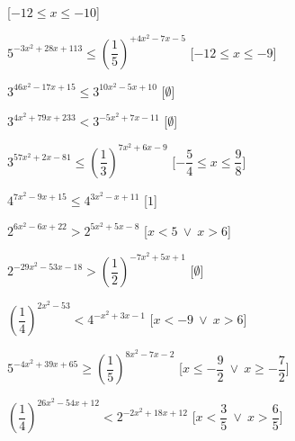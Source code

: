 \begin{esercizio}
\begin{enumeratea}
   \hfill [\(-12 \leqslant x \leqslant -10\)]
  \item  \(5^{-3 x^2 +28 x +113} \leqslant \left(\dfrac{1}{5}\right)^{+4 
x^2 -7 x -5}\)
   \hfill [\(-12 \leqslant x \leqslant -9\)]
  \item  \(3^{46 x^2 -17 x +15} \leqslant 3^{10 x^2 -5 x +10}\)
   \hfill [\(\emptyset\)]
  \item  \(3^{4 x^2 +79 x +233} < 3^{-5 x^2 +7 x -11}\)
   \hfill [\(\emptyset\)]
  \item  \(3^{57 x^2 +2 x -81} \leqslant \left(\dfrac{1}{3}\right)^{7 x^2 
+6 x -9}\)
   \hfill [\(-\dfrac{5}{4} \leqslant x \leqslant \dfrac{9}{8}\)]
  \item  \(4^{7 x^2 -9 x +15} \leqslant 4^{3 x^2 - x +11}\)
   \hfill [\(1\)]
  \item  \(2^{6 x^2 -6 x +22} > 2^{5 x^2 +5 x -8}\)
   \hfill [\(x < 5~\vee~x > 6\)]
  \item  \(2^{-29 x^2 -53 x -18} > 
\left(\dfrac{1}{2}\right)^{-7 x^2 +5 x +1}\)
   \hfill [\(\emptyset\)]
  \item  \(\left(\dfrac{1}{4}\right)^{2 x^2 -53} < 4^{-x^2 +3 x -1}\)
   \hfill [\(x < -9~\vee~x > 6\)]
  \item  \(5^{-4 x^2 +39 x +65} \geqslant \left(\dfrac{1}{5}\right)^{8 x^2 
-7 x -2}\)
   \hfill [\(x \leqslant -\dfrac{9}{2}~\vee~x \geqslant -\dfrac{7}{2}\)]
  \item  \(\left(\dfrac{1}{4}\right)^{26 x^2 -54 x +12} < 
2^{-2x^2 +18 x +12}\)
   \hfill [\(x < \dfrac{3}{5}~\vee~x > \dfrac{6}{5}\)]
 \end{enumeratea}
\end{esercizio}


